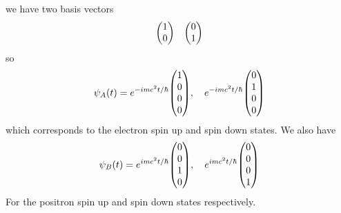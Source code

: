 \documentclass[../main.tex]{subfiles}
\begin{document}
we have two basis vectors
\begin{align*}
    \mqty(1 \\ 0) \quad \mqty(0 \\ 1)
\end{align*}
so
\begin{align*}
    \psi_A(t) = e^{-imc^2 t/\hbar} \mqty(1 \\ 0 \\ 0 \\ 0), \quad e^{-imc^2 t/\hbar} \mqty(0 \\ 1 \\ 0 \\ 0)
\end{align*}
which corresponds to the electron spin up and spin down states. We also have
\begin{align*}
    \psi_B(t) = e^{imc^2 t/\hbar} \mqty(0 \\ 0 \\ 1 \\ 0), \quad e^{imc^2 t/\hbar} \mqty(0 \\ 0 \\ 0 \\ 1)
\end{align*}
For the positron spin up and spin down states respectively.
\end{document}
